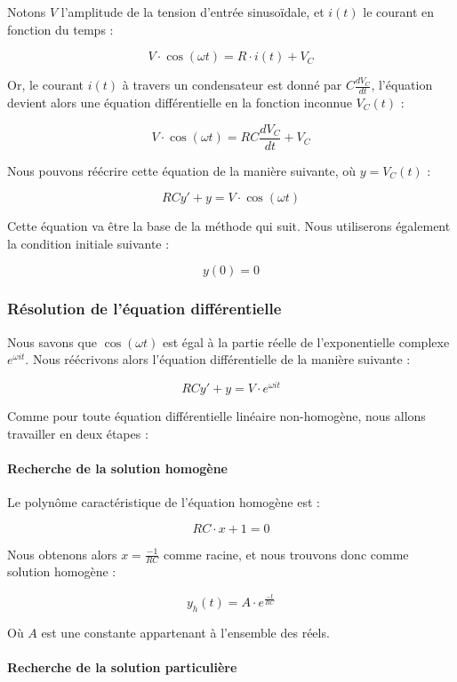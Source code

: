 Notons $V$ l'amplitude de la tension d'entrée sinusoïdale, et $i(t)$ le courant
en fonction du temps : 

$$V \cdot \cos (\omega t) = R \cdot i(t) + V_C$$

Or, le courant $i(t)$ à travers un condensateur est donné par $C \frac{dV_C}{dt}$, 
l'équation devient alors une équation différentielle en la fonction inconnue $V_C (t)$ :

$$V \cdot \cos (\omega t) = RC\frac{dV_C}{dt}  + V_C$$

Nous pouvons réécrire cette équation de la manière suivante, où $y = V_C(t)$ :

$$RCy' + y = V \cdot \cos (\omega t)$$

Cette équation va être la base de la méthode qui suit. Nous utiliserons également
la condition initiale suivante :

$$y(0) = 0$$

\subsubsection{Résolution de l'équation différentielle}

Nous savons que $\cos (\omega t)$ est égal à la partie réelle de l'exponentielle
complexe $e^{\omega i t}$. Nous réécrivons alors l'équation différentielle de la
manière suivante :

$$RCy' + y = V \cdot e^{\omega i t}$$

Comme pour toute équation différentielle linéaire non-homogène, nous allons travailler
en deux étapes :

\paragraph{Recherche de la solution homogène}

Le polynôme caractéristique de l'équation homogène est :

$$RC \cdot x + 1 = 0$$

Nous obtenons alors $x = \frac{-1}{RC}$ comme racine, et nous trouvons donc comme solution homogène :

$$y_h(t) = A \cdot e^{\frac{-t}{RC}}$$

Où $A$ est une constante appartenant à l'ensemble des réels. %

\paragraph{Recherche de la solution particulière}


